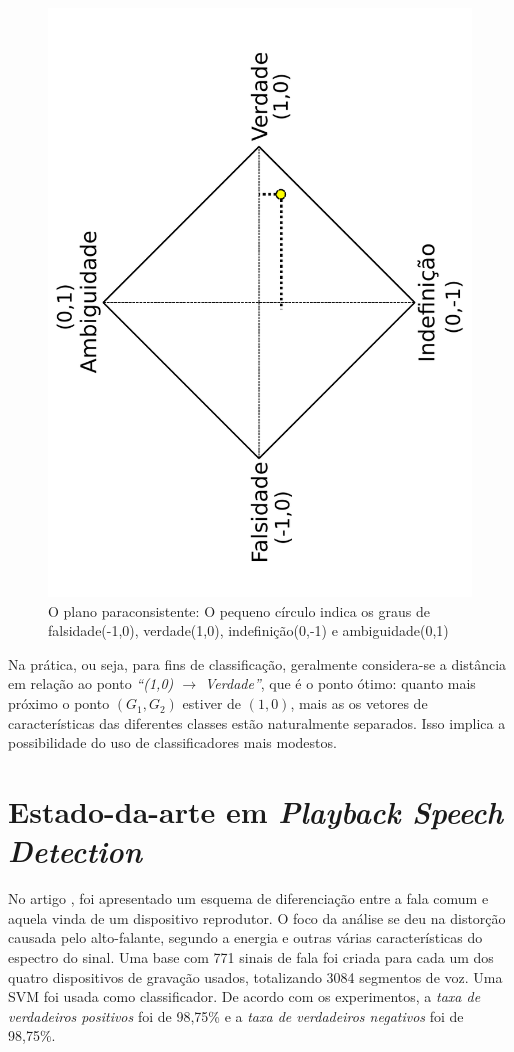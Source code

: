 			\begin{figure}[h]
				\centering
				\includegraphics[angle=-90, width=0.69\linewidth]{images/paraconsistentPlane.pdf}
				\caption{O plano paraconsistente: O pequeno círculo indica os graus de falsidade(-1,0), verdade(1,0), indefinição(0,-1) e ambiguidade(0,1)}
				\label{fig:paraconsistentplane}
			\end{figure}
		
		\par Na prática, ou seja, para fins de classificação, geralmente considera-se a distância em relação ao ponto \textit{``(1,0) $\rightarrow$ Verdade''}, que é o ponto ótimo: quanto mais próximo o ponto $(G_1,G_2)$ estiver de $(1,0)$, mais as os vetores de características das diferentes classes estão naturalmente separados. Isso implica a possibilidade do uso de classificadores mais modestos. 
		
	\section{Estado-da-arte em \textit{Playback Speech Detection}}
		\par No artigo \cite{Ren2019}, foi apresentado um esquema de diferenciação entre a fala comum e aquela vinda de um dispositivo reprodutor. O foco da análise se deu na distorção causada pelo alto-falante, segundo a energia e outras várias características do espectro do sinal. Uma base com 771 sinais de fala foi criada para cada um dos quatro dispositivos de gravação usados, totalizando 3084 segmentos de voz. Uma SVM foi usada como classificador. De acordo com os experimentos, a \textit{taxa de verdadeiros positivos} foi de 98,75\% e a \textit{taxa de verdadeiros negativos} foi de 98,75\%.\\
		
